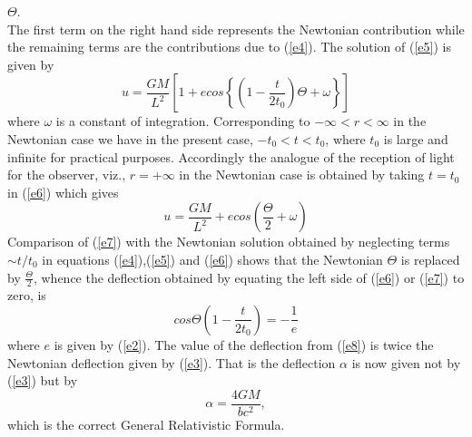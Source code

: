 $\Theta$.\\
The first term on the right hand side represents the Newtonian contribution
while the remaining terms are the contributions due to (\ref{e4}). The
solution of (\ref{e5}) is given by
\begin{equation}
u = \frac{GM}{L^2} \left[ 1 + ecos\left\{ \left(1-\frac{t}{2t_0}\right )
\Theta + \omega\right\}\right]\label{e6}
\end{equation}
where $\omega$ is a constant of integration. Corresponding to $-\infty < r < \infty$
in the Newtonian case we have in the present case, $-t_0 < t < t_0$, where
$t_0$ is large and infinite for practical purposes. Accordingly the analogue
of the reception of light for the observer, viz., $r = + \infty$ in the
Newtonian case is obtained by taking $t = t_0$ in (\ref{e6}) which gives
\begin{equation}
u = \frac{GM}{L^2} + ecos \left(\frac{\Theta}{2}
+ \omega \right)\label{e7}
\end{equation}
Comparison of (\ref{e7}) with the Newtonian solution obtained by neglecting
terms $\sim t/t_0$ in equations (\ref{e4}),(\ref{e5}) and (\ref{e6}) shows
that the Newtonian $\Theta$ is replaced by $\frac{\Theta}{2}$, whence the
deflection obtained by equating the left side of (\ref{e6}) or (\ref{e7})
to zero, is
\begin{equation}
cos \Theta \left(1-\frac{t}{2t_0}\right) = -\frac{1}{e}\label{e8}
\end{equation}
where $e$ is given by (\ref{e2}). The value of the deflection from
(\ref{e8}) is twice the Newtonian
deflection given by (\ref{e3}). That is the deflection $\alpha$ is
now given not by (\ref{e3}) but by
$$\alpha = \frac{4GM}{bc^2},$$
which is the correct General Relativistic Formula.
